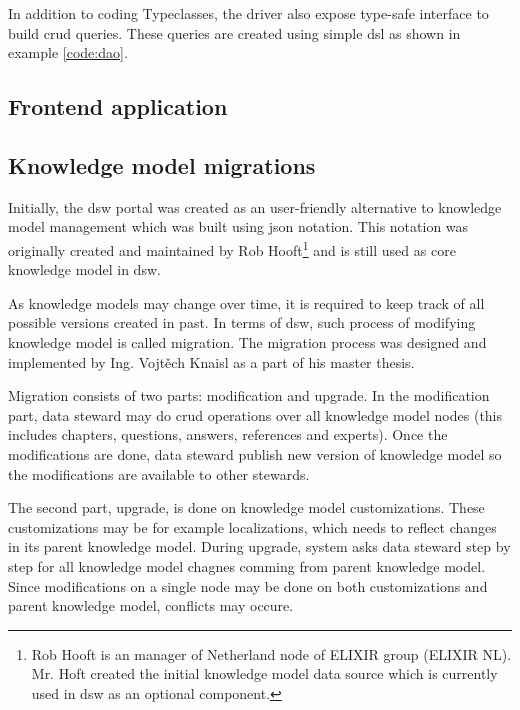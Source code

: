 In addition to coding Typeclasses, the driver also expose type-safe interface to build \gls{crud} queries.
These queries are created using simple \gls{dsl} as shown in example \ref{code:dao}.

\subsection{Frontend application}


\subsection{Knowledge model migrations}\label{sec:km-migrations}

Initially, the \gls{dsw} portal was created as an user-friendly alternative to knowledge model management which was built using \gls{json} notation.
This notation was originally created and maintained by Rob Hooft\footnote{Rob Hooft is an manager of Netherland node of ELIXIR group (ELIXIR NL). Mr. Hoft created the initial knowledge model data source which is currently used in \gls{dsw} as an optional component.} and is still used as core knowledge model in \gls{dsw}.

As knowledge models may change over time, it is required to keep track of all possible versions created in past.
In terms of \gls{dsw}, such process of modifying knowledge model is called migration.
The migration process was designed and implemented by Ing. Vojtěch Knaisl as a part of his master thesis\cite{mt-knaisl}.

Migration consists of two parts: modification and upgrade.
In the modification part, data steward may do \gls{crud} operations over all knowledge model nodes (this includes chapters, questions, answers, references and experts).
Once the modifications are done, data steward publish new version of knowledge model so the modifications are available to other stewards.

The second part, upgrade, is done on knowledge model customizations.
These customizations may be for example localizations, which needs to reflect changes in its parent knowledge model.
During upgrade, system asks data steward step by step for all knowledge model chagnes comming from parent knowledge model.
Since modifications on a single node may be done on both customizations and parent knowledge model, conflicts may occure.

